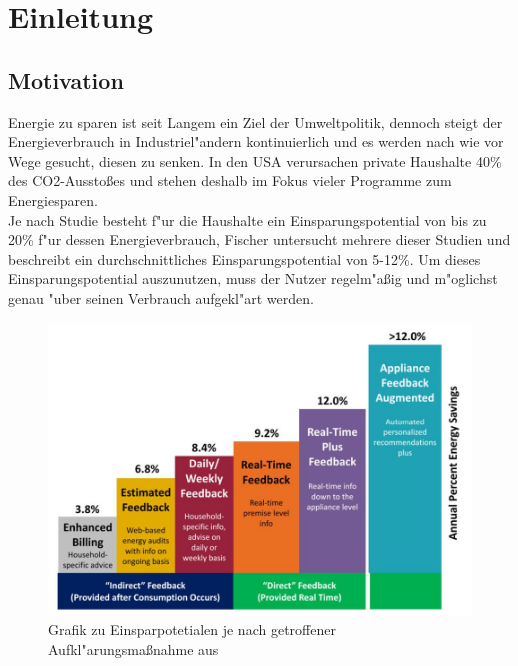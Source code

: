 \section{Einleitung}
\label{Einleitung}

\subsection{Motivation}
\label{Motivation}
	Energie zu sparen ist seit Langem ein Ziel der Umweltpolitik, dennoch steigt der Energieverbrauch in Industriel"andern kontinuierlich und es werden nach wie vor Wege gesucht, diesen zu senken. 
	In den USA verursachen private Haushalte 40\% des CO2-Aussto{\ss}es \cite{vandenbergh2008individual} und stehen deshalb im Fokus vieler Programme zum Energiesparen. \\
	Je nach Studie besteht f"ur die Haushalte ein Einsparungspotential von bis zu 20\% \cite{armel2013disaggregation} f"ur dessen Energieverbrauch, Fischer \cite{fischer2008feedback} untersucht mehrere dieser Studien und beschreibt ein durchschnittliches Einsparungspotential von 5-12\%. 
	Um dieses Einsparungspotential auszunutzen, muss der Nutzer regelm"a{\ss}ig und m"oglichst genau "uber seinen Verbrauch aufgekl"art werden. 	%
	\begin{figure}[ht]
\includegraphics[height=0.7\textwidth]{1_Grafiken/fig1armel.jpg}
	\caption[Einsparungpotentiale nach Ma{\ss}nahme]{Grafik zu Einsparpotetialen je nach getroffener Aufkl"arungsma{\ss}nahme aus \cite{armel2013disaggregation}}
\label{potentiale}
\end{figure}

